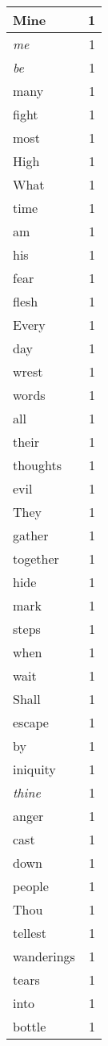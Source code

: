 \begin{center}
\begin{longtable}{l|r}
Mine & 1 \\ \hline
\emph{me} & 1 \\ \hline
\emph{be} & 1 \\ \hline
many & 1 \\ \hline
fight & 1 \\ \hline
most & 1 \\ \hline
High & 1 \\ \hline
What & 1 \\ \hline
time & 1 \\ \hline
am & 1 \\ \hline
his & 1 \\ \hline
fear & 1 \\ \hline
flesh & 1 \\ \hline
Every & 1 \\ \hline
day & 1 \\ \hline
wrest & 1 \\ \hline
words & 1 \\ \hline
all & 1 \\ \hline
their & 1 \\ \hline
thoughts & 1 \\ \hline
evil & 1 \\ \hline
They & 1 \\ \hline
gather & 1 \\ \hline
together & 1 \\ \hline
hide & 1 \\ \hline
mark & 1 \\ \hline
steps & 1 \\ \hline
when & 1 \\ \hline
wait & 1 \\ \hline
Shall & 1 \\ \hline
escape & 1 \\ \hline
by & 1 \\ \hline
iniquity & 1 \\ \hline
\emph{thine} & 1 \\ \hline
anger & 1 \\ \hline
cast & 1 \\ \hline
down & 1 \\ \hline
people & 1 \\ \hline
Thou & 1 \\ \hline
tellest & 1 \\ \hline
wanderings & 1 \\ \hline
tears & 1 \\ \hline
into & 1 \\ \hline
bottle & 1 \\ \hline

\end{longtable}
\end{center}
